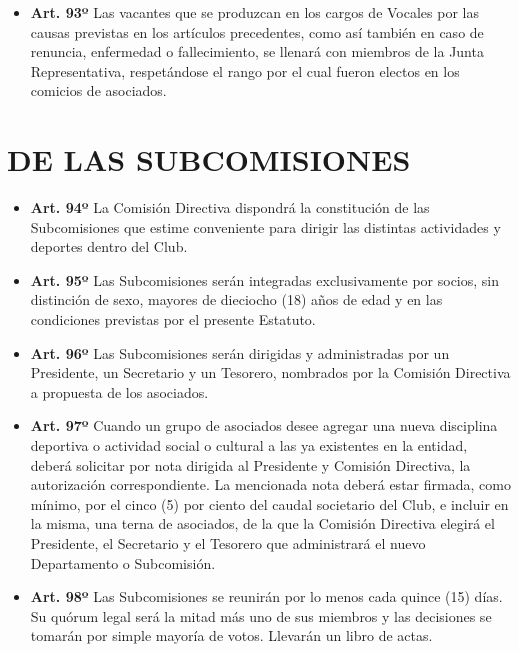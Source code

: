\documentclass[]{book}
\providecommand{\tightlist}{%
  \setlength{\itemsep}{0pt}\setlength{\parskip}{0pt}}
\begin{document}
\begin{itemize}
\tightlist
\item
  \textbf{Art. 93º} Las vacantes que se produzcan en los cargos de
  Vocales por las causas previstas en los artículos precedentes, como
  así también en caso de renuncia, enfermedad o fallecimiento, se
  llenará con miembros de la Junta Representativa, respetándose el rango
  por el cual fueron electos en los comicios de asociados.
\end{itemize}

\chapter{DE LAS SUBCOMISIONES}\label{de-las-subcomisiones}

\begin{itemize}
\item
  \textbf{Art. 94º} La Comisión Directiva dispondrá la constitución de
  las Subcomisiones que estime conveniente para dirigir las distintas
  actividades y deportes dentro del Club.
\item
  \textbf{Art. 95º} Las Subcomisiones serán integradas exclusivamente
  por socios, sin distinción de sexo, mayores de dieciocho (18) años de
  edad y en las condiciones previstas por el presente Estatuto.
\item
  \textbf{Art. 96º} Las Subcomisiones serán dirigidas y administradas
  por un Presidente, un Secretario y un Tesorero, nombrados por la
  Comisión Directiva a propuesta de los asociados.
\item
  \textbf{Art. 97º} Cuando un grupo de asociados desee agregar una nueva
  disciplina deportiva o actividad social o cultural a las ya existentes
  en la entidad, deberá solicitar por nota dirigida al Presidente y
  Comisión Directiva, la autorización correspondiente. La mencionada
  nota deberá estar firmada, como mínimo, por el cinco (5) por ciento
  del caudal societario del Club, e incluir en la misma, una terna de
  asociados, de la que la Comisión Directiva elegirá el Presidente, el
  Secretario y el Tesorero que administrará el nuevo Departamento o
  Subcomisión.
\item
  \textbf{Art. 98º} Las Subcomisiones se reunirán por lo menos cada
  quince (15) días. Su quórum legal será la mitad más uno de sus
  miembros y las decisiones se tomarán por simple mayoría de votos.
  Llevarán un libro de actas.
\end{itemize}
\end{document}

